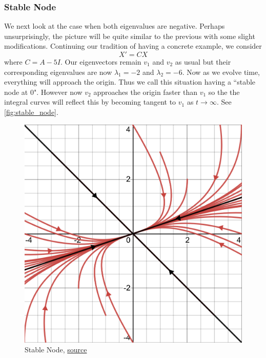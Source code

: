 \subsubsection{Stable Node}
We next look at the case when both eigenvalues are negative. Perhaps unsurprisingly, the picture will be quite similar to the previous with some slight modifications. Continuing our tradition of having a concrete example, we consider
\begin{equation}
    X' = CX
\end{equation}
where $C = A - 5 I$. Our eigenvectors remain $v_1$ and $v_2$ as usual but their corresponding eigenvalues are now $\lambda_1 = -2$ and $\lambda_2 = -6$. Now as we evolve time, everything will approach the origin. Thus we call this situation having a ``stable node at 0". However now $v_2$ approaches the origin faster than $v_1$ so the the integral curves will reflect this by becoming tangent to $v_1$ as $t \to \infty$. See \autoref{fig:stable_node}.
\begin{figure}[ht]
    \centering
    \includegraphics[scale=0.25]{Images/stable_node.png}
    \caption{Stable Node, \href{https://www.desmos.com/calculator/zw6kxpb5aw}{source}}
    \label{fig:stable_node}
\end{figure}

